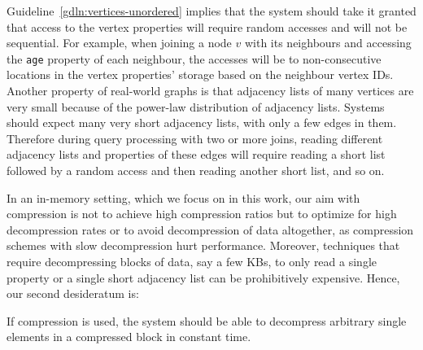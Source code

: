 \begin{guideline}
\label{gdln:fast-decompress}
Guideline~\ref{gdln:vertices-unordered} implies that the system should take it granted that access to the vertex properties will require random accesses and will not be sequential. For example, when joining a node $v$ with its neighbours and accessing the \texttt{age} property of each neighbour, the accesses will be to non-consecutive locations in the vertex properties' storage based on the neighbour vertex IDs. Another property of real-world graphs is that adjacency lists of many vertices are very small because of the power-law distribution of adjacency lists. Systems should expect many very short adjacency lists, with only a few edges in them. Therefore during query processing with two or more joins, reading different adjacency lists and properties of these edges will require reading a short list followed by a random access and then reading another short list, and so on.

In an in-memory setting, which we focus on in this work, our aim with compression is not to achieve high compression ratios but to optimize for high decompression rates or to avoid decompression of data altogether, as compression schemes with slow decompression hurt performance. Moreover, techniques that require decompressing blocks of data, say a few KBs, to only read a single property or a single short adjacency list can be prohibitively expensive. Hence, our second desideratum is:
\begin{desideratum}
\label{des:compression}
If compression is used, the system should be able to decompress arbitrary single elements in a compressed block in constant time.
\end{desideratum}  

\end{guideline}

